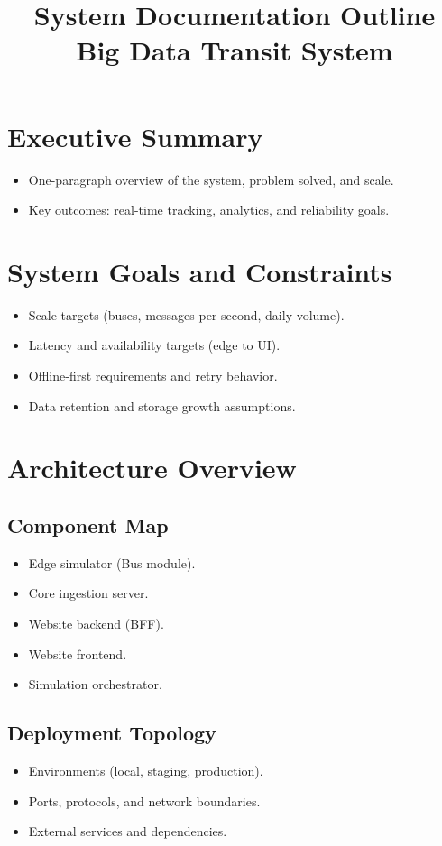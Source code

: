 \documentclass[12pt, a4paper]{article}
\title{\textbf{System Documentation Outline}\\
\large Big Data Transit System}
\date{\vspace{-5ex}}
\begin{document}
\maketitle
\tableofcontents
\newpage

\section{Executive Summary}
\begin{itemize}[leftmargin=*]
    \item One-paragraph overview of the system, problem solved, and scale.
    \item Key outcomes: real-time tracking, analytics, and reliability goals.
\end{itemize}

\section{System Goals and Constraints}
\begin{itemize}[leftmargin=*]
    \item Scale targets (buses, messages per second, daily volume).
    \item Latency and availability targets (edge to UI).
    \item Offline-first requirements and retry behavior.
    \item Data retention and storage growth assumptions.
\end{itemize}

\section{Architecture Overview}
\subsection{Component Map}
\begin{itemize}[leftmargin=*]
    \item Edge simulator (Bus module).
    \item Core ingestion server.
    \item Website backend (BFF).
    \item Website frontend.
    \item Simulation orchestrator.
\end{itemize}

\subsection{Deployment Topology}
\begin{itemize}[leftmargin=*]
    \item Environments (local, staging, production).
    \item Ports, protocols, and network boundaries.
    \item External services and dependencies.
\end{itemize}
\end{document}
